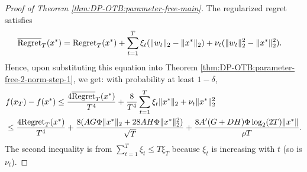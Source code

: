\begin{proof}[Proof of Theorem \ref{thm:DP-OTB:parameter-free-main}]
The regularized regret satisfies
\begin{align*}
    \overline {\mathrm{Regret}}_T(x^*) 
    &= \mathrm{Regret}_T(x^*) + \sum_{t=1}^T \xi_t(\|w_t\|_2-\|x^*\|_2)+\nu_t(\|w_t\|_2^2-\|x^*\|_2^2).
\end{align*}
Hence, upon substituting this equation into Theorem \ref{thm:DP-OTB:parameter-free-2-norm-step-1}, we get: with probability at least $1-\delta$,
\begin{align*}
    &f(x_T)-f(x^*) 
    \leq \frac{4\overline{\mathrm{Regret}}_T(x^*)}{T^4} + \frac{8}{T^4} \sum_{t=1}^T \xi_t\|x^*\|_2 + \nu_t\|x^*\|_2^2 \\
    &\leq \frac{4\mathrm{Regret}_T(x^*)}{T^4} + \frac{8(AG\Phi\|x^*\|_2+28AH\Phi\|x^*\|_2^2)}{\sqrt{T}} + \frac{8A'(G+DH)\Phi\log_2(2T)\|x^*\|}{\rho T}.
\end{align*}
The second inequality is from $\sum_{t=1}^T \xi_t \leq T\xi_T$ because $\xi_t$ is increasing with $t$ (so is $\nu_t$). 


\end{proof}

